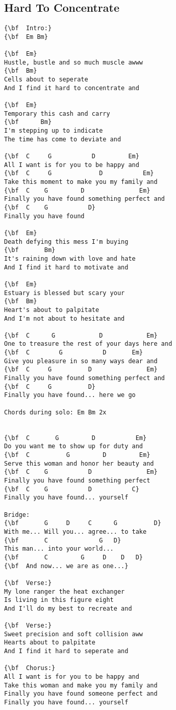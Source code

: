 \documentclass[a4paper]{article}
\begin{document}
\subsection{Hard To Concentrate}
\begin{Verbatim}[commandchars=\\\{\}]
{\bf  Intro:}
{\bf  Em Bm}

{\bf  Em}
Hustle, bustle and so much muscle awww
{\bf  Bm}
Cells about to seperate
And I find it hard to concentrate and

{\bf  Em}
Temporary this cash and carry
{\bf      Bm}
I'm stepping up to indicate
The time has come to deviate and

{\bf  C     G           D         Em}
All I want is for you to be happy and
{\bf  C     G             D           Em}
Take this moment to make you my family and
{\bf  C    G 		 D               Em}
Finally you have found something perfect and
{\bf  C    G           D}
Finally you have found

{\bf  Em}
Death defying this mess I'm buying
{\bf       Bm}
It's raining down with love and hate
And I find it hard to motivate and

{\bf  Em}
Estuary is blessed but scary your
{\bf  Bm}
Heart's about to palpitate
And I'm not about to hesitate and

{\bf  C      G            D            Em}
One to treasure the rest of your days here and
{\bf  C        G           D       Em}
Give you pleasure in so many ways dear and
{\bf  C     G          D               Em}
Finally you have found something perfect and
{\bf  C     G          D}
Finally you have found... here we go

Chords during solo: Em Bm 2x


{\bf  C       G         D           Em}
Do you want me to show up for duty and
{\bf  C          G         D         Em}
Serve this woman and honor her beauty and
{\bf  C    G           D               Em}
Finally you have found something perfect
{\bf  C    G           D           C}
Finally you have found... yourself

Bridge:
{\bf       G     D     C      G          D}
With me... Will you... agree... to take
{\bf       C		      G   D}
This man... into your world...
{\bf       C         G     D    D   D}
{\bf  And now... we are as one...}

{\bf  Verse:}
My lone ranger the heat exchanger
Is living in this figure eight
And I'll do my best to recreate and

{\bf  Verse:}
Sweet precision and soft collision aww
Hearts about to palpitate
And I find it hard to seperate and

{\bf  Chorus:}
All I want is for you to be happy and
Take this woman and make you my family and
Finally you have found someone perfect and
Finally you have found... yourself

\end{Verbatim}
\newpage
\end{document}

